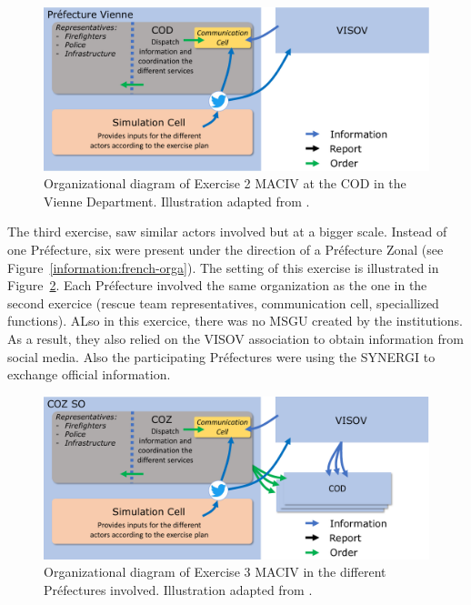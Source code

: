 \begin{figure}[htb]
    \centering
    \includegraphics[width=\textwidth]{figures/chap-3/exercice-2-setup.pdf}
    \caption{Organizational diagram of Exercise 2 MACIV at the COD in the Vienne Department. Illustration adapted from \textcite{batardIntegrerContributionsCitoyennes2021}.}
    \label{information:exercice-2-setup}
\end{figure}

The third exercise, saw similar actors involved but at a bigger scale.
Instead of one Préfecture, six were present under the direction of a Préfecture Zonal (see Figure~\ref{information:french-orga}).
The setting of this exercise is illustrated in Figure~\ref{information:exercice-3-setup}.
Each Préfecture involved the same organization as the one in the second exercice (rescue team representatives, communication cell, speciallized functions).
ALso in this exercice, there was no MSGU created by the institutions.
As a result, they also relied on the VISOV association to obtain information from social media.
Also the participating Préfectures were using the SYNERGI to exchange official information.

\begin{figure}[htb]
    \centering
    \includegraphics[width=\textwidth]{figures/chap-3/exercice-3-setup.pdf}
    \caption{Organizational diagram of Exercise 3 MACIV in the different Préfectures involved. Illustration adapted from \textcite{batardIntegrerContributionsCitoyennes2021}.}
    \label{information:exercice-3-setup}
\end{figure}

